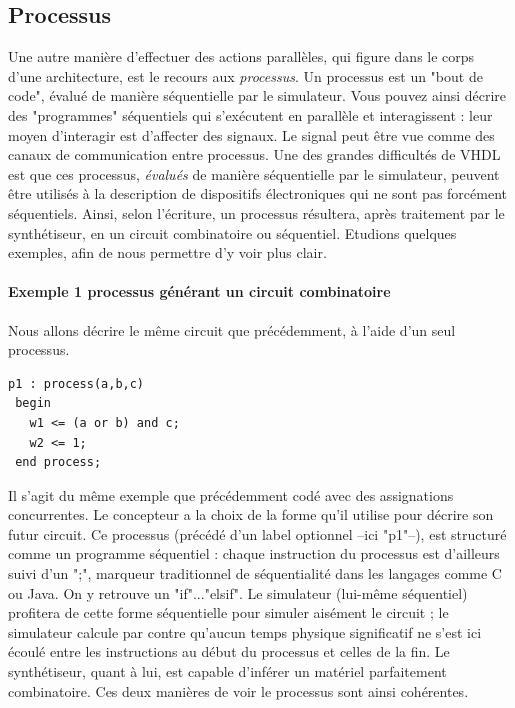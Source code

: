 \subsection{Processus}
Une autre manière d'effectuer des actions parallèles, qui figure dans le corps d'une architecture, est le recours aux {\it processus}. Un processus est un "bout de code", évalué de manière séquentielle par le simulateur.
Vous pouvez ainsi décrire des "programmes" séquentiels qui s'exécutent en parallèle et interagissent : leur moyen d'interagir est d'affecter des signaux. Le signal peut être vue comme des canaux de communication entre processus.
Une des grandes difficultés de VHDL est que ces processus, {\it évalués} de manière séquentielle par le simulateur, peuvent être utilisés à la description de dispositifs électroniques qui ne sont pas forcément séquentiels.
Ainsi, selon l'écriture, un processus résultera, après traitement par le synthétiseur, en un circuit combinatoire ou séquentiel. Etudions quelques exemples, afin de nous permettre d'y voir plus clair.

\paragraph{Exemple 1 \: processus générant un circuit combinatoire}
Nous allons décrire le même circuit que précédemment, à l'aide d'un seul processus.

\begin{lstlisting}[frame=single]
 p1 : process(a,b,c)
 begin
   w1 <= (a or b) and c;
   w2 <= 1;
 end process;
\end{lstlisting}

Il s'agit  du même exemple que précédemment codé avec des assignations concurrentes. Le concepteur a la choix de la forme
qu'il utilise pour décrire son futur circuit. Ce processus (précédé d'un label optionnel --ici "p1"--), est structuré comme un programme séquentiel : chaque instruction du processus est d'ailleurs suivi d'un ";", marqueur traditionnel de séquentialité
dans les langages comme C ou Java. On y retrouve un "if"..."elsif". Le simulateur (lui-même séquentiel) profitera de cette forme séquentielle pour simuler aisément le circuit ; le simulateur calcule par contre
qu'aucun temps physique significatif ne s'est ici écoulé entre les instructions au début du processus et celles de la fin. Le synthétiseur, quant à lui, est capable d'inférer un matériel parfaitement combinatoire.
Ces deux manières de voir le processus sont ainsi cohérentes.

